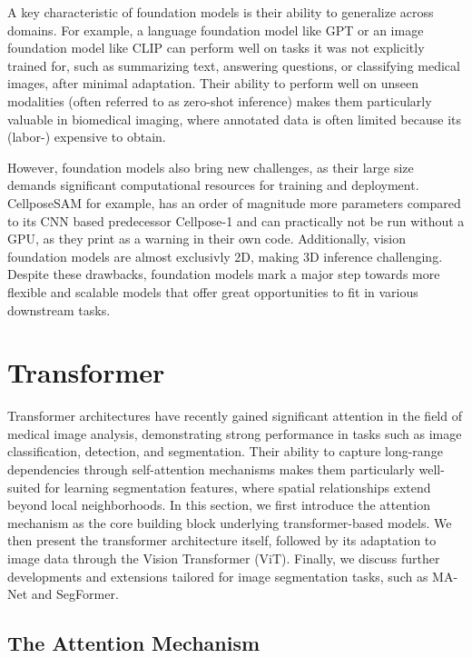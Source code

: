 A key characteristic of foundation models is their ability to generalize across domains. For example, a language foundation model like GPT or an image foundation model like CLIP can perform well on tasks it was not explicitly trained for, such as summarizing text, answering questions, or classifying medical images, after minimal adaptation. Their ability to perform well on unseen modalities (often referred to as zero-shot inference) makes them particularly valuable in biomedical imaging, where annotated data is often limited because its (labor-) expensive to obtain. 

However, foundation models also bring new challenges, as their large size demands significant computational resources for training and deployment. CellposeSAM for example, has an order of magnitude more parameters compared to its CNN based predecessor Cellpose-1 and can practically not be run without a GPU, as they print as a warning in their own code.  
Additionally, vision foundation models are almost exclusivly 2D, making 3D inference challenging. Despite these drawbacks, foundation models mark a major step towards more flexible and scalable models that offer great opportunities to fit in various downstream tasks.



\section{Transformer}

Transformer architectures have recently gained significant attention in the field of medical image analysis, demonstrating strong performance in tasks such as image classification, detection, and segmentation. Their ability to capture long-range dependencies through self-attention mechanisms makes them particularly well-suited for learning segmentation features, where spatial relationships extend beyond local neighborhoods. In this section, we first introduce the attention mechanism as the core building block underlying transformer-based models. We then present the transformer architecture itself, followed by its adaptation to image data through the Vision Transformer (ViT). Finally, we discuss further developments and extensions tailored for image segmentation tasks, such as MA-Net and SegFormer.

\subsection{The Attention Mechanism}


